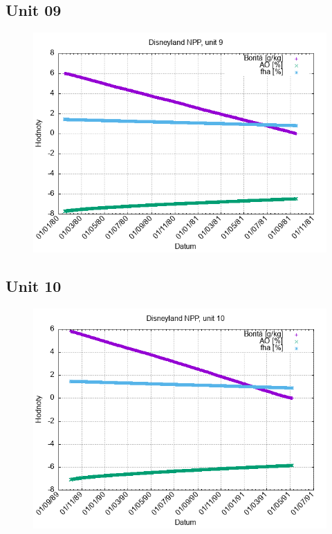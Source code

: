 \documentclass{article}
\begin{document}
\subsection*{Unit 09}
\begin{figure}[h!]
\centering
\includegraphics[width=14cm]{./grafy/Disneyland09.png}
\end{figure}
\clearpage
\subsection*{Unit 10}
\begin{figure}[h!]
\centering
\includegraphics[width=14cm]{./grafy/Disneyland10.png}
\end{figure}
\clearpage
\end{document}
